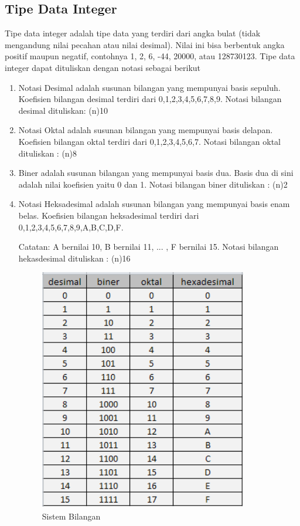 \subsection{Tipe Data Integer}
Tipe data integer adalah tipe data yang terdiri dari angka bulat (tidak mengandung nilai pecahan atau nilai desimal). Nilai ini bisa berbentuk angka positif maupun negatif, contohnya 1, 2, 6, -44, 20000, atau 128730123. Tipe data integer dapat dituliskan dengan notasi sebagai berikut
\begin{enumerate}
\item Notasi Desimal adalah susunan bilangan yang mempunyai basis sepuluh. 
Koefisien bilangan desimal terdiri dari 0,1,2,3,4,5,6,7,8,9.
Notasi bilangan desimal dituliskan: (n)10
\item Notasi Oktal adalah susunan bilangan yang mempunyai basis delapan. 
Koefisien bilangan oktal terdiri dari 0,1,2,3,4,5,6,7.
Notasi bilangan oktal dituliskan : (n)8
\item Biner adalah susunan bilangan yang mempunyai basis dua. 
Basis dua di sini adalah nilai koefisien yaitu 0 dan 1.
Notasi bilangan biner dituliskan : (n)2
\item Notasi Heksadesimal adalah susunan bilangan yang mempunyai basis enam belas. 
Koefisien bilangan heksadesimal terdiri dari 0,1,2,3,4,5,6,7,8,9,A,B,C,D,F.

Catatan: A bernilai 10, B bernilai 11, ... , F bernilai 15.
Notasi bilangan hekasdesimal dituliskan : (n)16

\begin{figure}[!htbp]
 \centering
 \includegraphics[width=.50\textwidth]{figures/sistem_bilangan.png}
 \caption{Sistem Bilangan}\label{fig:inputchapter}
\end{figure}
\end{enumerate}

